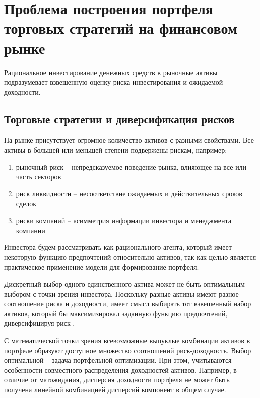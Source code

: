 \chapter{Проблема построения портфеля торговых стратегий на финансовом рынке}
Рациональное инвестирование денежных средств в рыночные активы подразумевает взвешенную оценку риска инвестирования и ожидаемой доходности. 
\section{Торговые стратегии и диверсификация рисков}
На рынке присутствует огромное количество активов с разными свойствами. Все активы в большей или меньшей степени подвержены рискам, например:
\begin{enumerate}
	\item рыночный риск -- непредсказуемое поведение рынка, влияющее на все или часть секторов
	\item риск ликвидности -- несоответствие ожидаемых и действительных сроков сделок
	\item риски компаний -- асимметрия информации инвестора и менеджмента компании
\end{enumerate}
Инвестора будем рассматривать как рационального агента, который имеет некоторую функцию предпочтений относительно активов, так как целью является практическое применение модели для формирование портфеля. 

Дискретный выбор одного единственного актива может не быть оптимальным выбором с точки зрения инвестора. Поскольку разные активы имеют разное соотношение риска и доходности, имеет смысл выбирать тот взвешенный набор активов, который бы максимизировал заданную функцию предпочтений, диверсифицируя риск \citep{markovitz1959}.

С математической точки зрения всевозможные выпуклые комбинации активов в портфеле образуют доступное множество соотношений риск-доходность. Выбор оптимальной -- задача портфельной оптимизации. При этом, учитываются особенности совместного распределения доходностей активов. Например, в отличие от матожидания, дисперсия доходности портфеля не может быть получена линейной комбинацией дисперсий компонент в общем случае. 

